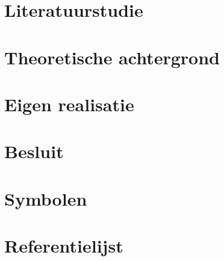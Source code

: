 \documentclass[ti,twoside,openright,a4paper,11pt]{uantwerpenbamathesis}
\begin{document}
\kant[6]

\kant[7]

\kant[8]

\kant[9]

\kant[10]

\chapter{Literatuurstudie}

\chapter{Theoretische achtergrond}

\chapter{Eigen realisatie}

\chapter{Besluit}

\appendix

\chapter{Symbolen}
\chapter{Referentielijst}
\end{document}
